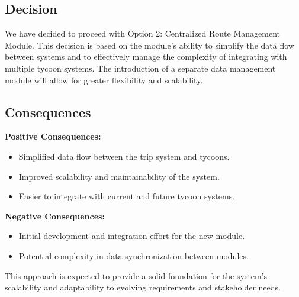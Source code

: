 \subsection*{Decision}
We have decided to proceed with Option 2: Centralized Route Management Module. This decision is based on the module's ability to simplify the data flow between systems and to effectively manage the complexity of integrating with multiple tycoon systems. The introduction of a separate data management module will allow for greater flexibility and scalability.

\subsection*{Consequences}
\textbf{Positive Consequences:}
\begin{itemize}
    \item Simplified data flow between the trip system and tycoons.
    \item Improved scalability and maintainability of the system.
    \item Easier to integrate with current and future tycoon systems.
\end{itemize}
\textbf{Negative Consequences:}
\begin{itemize}
    \item Initial development and integration effort for the new module.
    \item Potential complexity in data synchronization between modules.
\end{itemize}
This approach is expected to provide a solid foundation for the system's scalability and adaptability to evolving requirements and stakeholder needs.